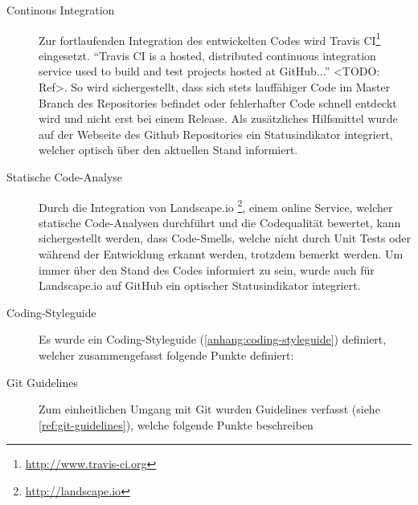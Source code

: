 \begin{description}
	\item[Continous Integration] Zur fortlaufenden Integration des entwickelten
	Codes wird Travis CI\footnote{\url{http://www.travis-ci.org}} eingesetzt.
	\enquote{Travis CI is a hosted, distributed continuous integration service used
	to build and test projects hosted at GitHub...} <TODO: Ref>. So wird
	sichergestellt, dass sich stets lauffähiger Code im Master Branch des
	Repositories befindet oder fehlerhafter Code schnell entdeckt wird und nicht
	erst bei einem Release. Als zusätzliches Hilfsmittel wurde auf der Webseite des
	Github Repositories ein Statusindikator integriert, welcher optisch über den
	aktuellen Stand informiert.

	\item[Statische Code-Analyse] Durch die Integration von Landscape.io
	\footnote{\url{http://landscape.io}}, einem online Service, welcher statische
	Code-Analysen durchführt und die Codequalität bewertet, kann sichergestellt
	werden, dass Code-Smells, welche nicht durch Unit Tests oder während der
	Entwicklung erkannt werden, trotzdem bemerkt werden. Um immer über den Stand
	des Codes informiert zu sein, wurde auch für Landscape.io auf GitHub ein
	optischer Statusindikator integriert.

	\item[Coding-Styleguide] Es wurde ein Coding-Styleguide
	(\autoref{anhang:coding-styleguide}) definiert, welcher zusammengefasst folgende
	Punkte definiert:

	\item[Git Guidelines] Zum einheitlichen Umgang mit Git wurden Guidelines
	verfasst (siehe \autoref{ref:git-guidelines}), welche folgende Punkte
	beschreiben

\end{description}

